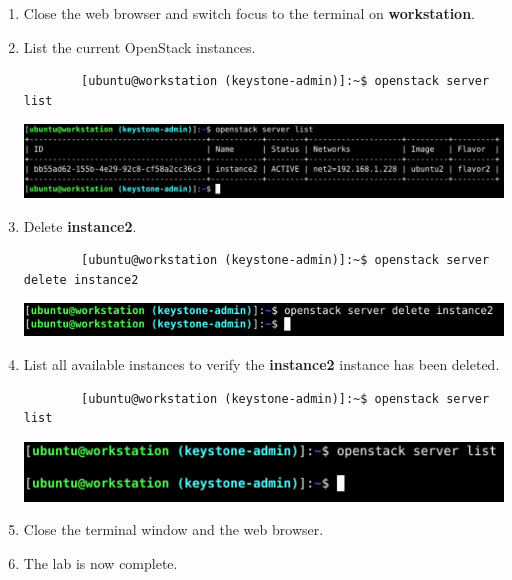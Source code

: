 \documentclass[letterpaper, 12pt]{article}
\begin{document}
\begin{enumerate}
    \item Close the web browser and switch focus to the terminal on \textbf{workstation}.

    \item List the current OpenStack instances.
    \begin{lstlisting}
        [ubuntu@workstation (keystone-admin)]:~$ openstack server list
    \end{lstlisting}

    \begin{center}
        \includegraphics[width=\linewidth]{images/part5/step12.png}
    \end{center}

    \item Delete \textbf{instance2}.
    \begin{lstlisting}
        [ubuntu@workstation (keystone-admin)]:~$ openstack server delete instance2
    \end{lstlisting}

    \begin{center}
        \includegraphics[width=\linewidth]{images/part5/step13.png}
    \end{center}

    \item List all available instances to verify the \textbf{instance2} instance has been deleted.
    \begin{lstlisting}
        [ubuntu@workstation (keystone-admin)]:~$ openstack server list
    \end{lstlisting}

    \begin{center}
        \includegraphics[width=\linewidth]{images/part5/step14.png}
    \end{center}

    \item Close the terminal window and the web browser.

    \item The lab is now complete.

\end{enumerate}
\end{document}
